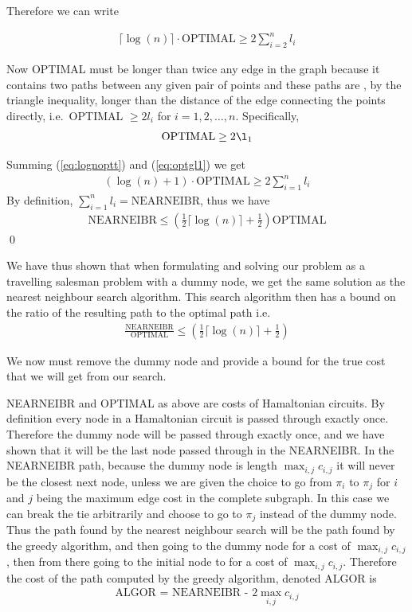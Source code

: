 Therefore we can write

\begin{align}
\lceil \log(n) \rceil \cdot \text{OPTIMAL} \geq 2 \sum_{i = 2}^n l_i \label{eq:lognoptt}
\end{align}

Now OPTIMAL must be longer than twice any edge in the graph because it contains two paths between any given pair of points and these paths are , by the triangle  inequality, longer than the distance of the edge connecting the points directly, i.e.\ OPTIMAL $\geq 2 l_i$ for $i = 1,2,\dots, n$. Specifically,
\begin{align}
\text{OPTIMAL} \geq 2 \l_1 \label{eq:optgl1}
\end{align}

Summing (\ref{eq:lognoptt}) and (\ref{eq:optgl1}) we get 
\begin{align*}
(\log(n)+1) \cdot \text{OPTIMAL} \geq 2 \sum_{i=1}^n l_i
\end{align*}
By definition, $\sum_{i=1}^n l_i = \text{NEARNEIBR}$, thus we have 
\begin{align*}
\text{NEARNEIBR} \leq (\frac{1}{2} \lceil \log(n) \rceil + \frac{1}{2}) \text{OPTIMAL}
\end{align*}
\qed 

We have thus shown that when formulating and solving our problem as a travelling salesman problem with a dummy node, we get the same solution as the nearest neighbour search algorithm. This search algorithm then has a bound on the ratio of the resulting path to the optimal path i.e.\ 
\begin{align*}
\frac{\text{NEARNEIBR}}{\text{OPTIMAL}} \leq (\frac{1}{2} \lceil \log(n) \rceil + \frac{1}{2}) 
\end{align*}

We now must remove the dummy node and provide a bound for the true cost that we will get from our search. 

NEARNEIBR and OPTIMAL as above are costs of Hamaltonian circuits. By definition every node in a Hamaltonian circuit is passed through exactly once. Therefore the dummy node will be passed through exactly once, and we have shown that it will be the last node passed through in the NEARNEIBR. In the NEARNEIBR path, because the dummy node is length $\max_{i,j} c_{i,j}$ it will never be the closest next node, unless we are given the choice to go from $\pi_i$ to $\pi_j$ for $i$ and $j$ being the maximum edge cost in the complete subgraph. In this case we can break the tie arbitrarily and choose to go to $\pi_j$ instead of the dummy node. Thus the path found by the nearest neighbour search will be the path found by the greedy algorithm, and then going to the dummy node for a cost of $\max_{i,j} c_{i,j}$, then from there going to the initial node to for a cost of $\max_{i,j} c_{i,j}$. Therefore the cost of the path computed by the greedy algorithm, denoted ALGOR is 
\begin{align*}
\text{ALGOR = NEARNEIBR - } 2\max_{i,j} c_{i,j} 
\end{align*}

